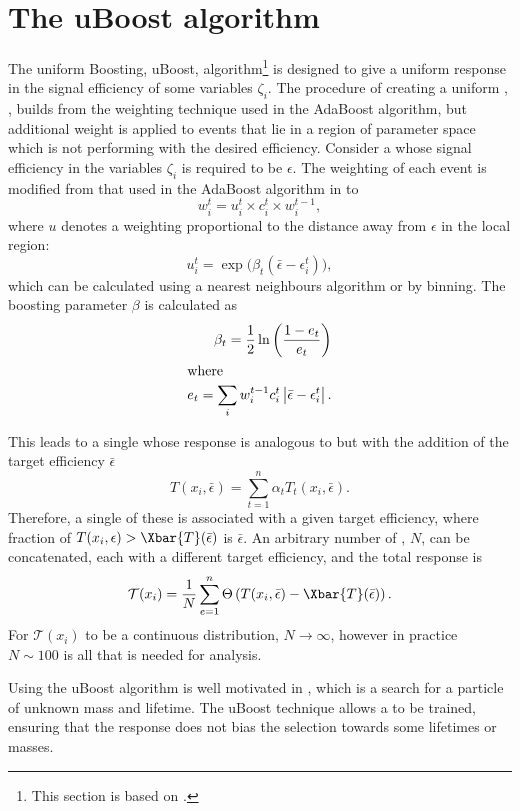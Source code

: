 \section{The uBoost algorithm}
\label{sec:bdt:uboost}
The uniform Boosting, uBoost, algorithm\footnote{
  This section is based on .} is designed to give a uniform
response in the signal efficiency of some variables $\zeta_i$.
The procedure of creating a uniform \BDT, \uBDT, builds from the weighting technique used in the
AdaBoost algorithm, but additional weight is applied to events that lie in a region of parameter
space which is not performing with the desired efficiency.
Consider a \BDT whose signal efficiency in the variables $\zeta_i$ is required to be $\epsilon$.
The weighting of each event is modified from that used in the AdaBoost algorithm in 
to
\begin{equation}
  w_i^t = u_i^t\times c_i^t \times w_i^{t-1},
\end{equation}
where $u$ denotes a weighting proportional to the distance away from $\epsilon$ in the local
region:
\begin{equation}
  u_i^t = \exp\big(\beta_t(\bar\epsilon-\epsilon_i^t)\big),
\end{equation}
which can be calculated using a nearest neighbours algorithm or by binning.
The boosting parameter $\beta$ is calculated as
\begin{align}
  \beta_t = \frac12\ln\left(\frac{1-e_t}{e_t}\right) \\
  \intertext{where}
  e_t = \sum_i w_i^{t-1}c_i^t\left|\bar\epsilon-\epsilon_i^t\right|.
\end{align}

This leads to a single \BDT whose response is analogous to  but with the addition
of the target efficiency $\bar\epsilon$
\begin{equation}
  T(x_i,\bar\epsilon) = \sum_{t=1}^{n} \alpha_tT_t(x_i,\bar\epsilon).
  \label{eq:ada:fullbdt}
\end{equation}
Therefore, a single of these \BDTs is associated with a given target efficiency, where
fraction of $T(x_i,\epsilon)>\Xbar{T}(\bar\epsilon)$ is $\bar\epsilon$.
An arbitrary number of \BDTs, $N$, can be concatenated, each with a different target efficiency, and
the total response is
\begin{equation}
  \mathcal{T}(x_i) =
  \frac1N\sum_{e=1}^{n}\Theta\left(T(x_i, \bar\epsilon) - \Xbar{T}(\bar\epsilon)\right).
\end{equation}
For $\mathcal{T}(x_i)$ to be a continuous distribution, $N\!\to\infty$, however in practice
$N\sim100$ is all that is needed for analysis.

Using the uBoost algorithm is well motivated in , which is a search for a particle
of unknown mass and lifetime.
The uBoost technique allows a \BDT to be trained, ensuring that the response does not bias
the selection towards some lifetimes or masses.













